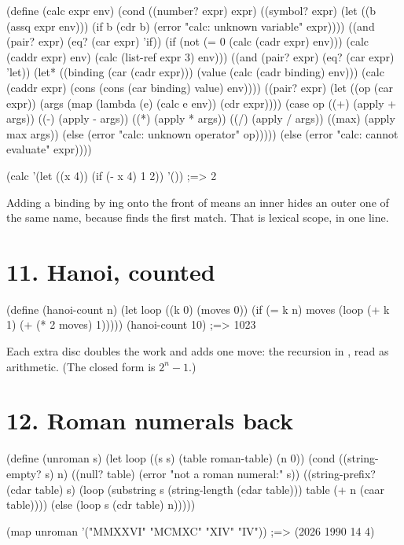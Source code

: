 \begin{scm}
(define (calc expr env)
  (cond ((number? expr) expr)
        ((symbol? expr)
         (let ((b (assq expr env)))
           (if b (cdr b) (error "calc: unknown variable" expr))))
        ((and (pair? expr) (eq? (car expr) 'if))
         (if (not (= 0 (calc (cadr expr) env)))
             (calc (caddr expr) env)
             (calc (list-ref expr 3) env)))
        ((and (pair? expr) (eq? (car expr) 'let))
         (let* ((binding (car (cadr expr)))
                (value (calc (cadr binding) env)))
           (calc (caddr expr) (cons (cons (car binding) value) env))))
        ((pair? expr)
         (let ((op (car expr))
               (args (map (lambda (e) (calc e env)) (cdr expr))))
           (case op
             ((+) (apply + args)) ((-) (apply - args))
             ((*) (apply * args)) ((/) (apply / args))
             ((max) (apply max args))
             (else (error "calc: unknown operator" op)))))
        (else (error "calc: cannot evaluate" expr))))

(calc '(let ((x 4)) (if (- x 4) 1 2)) '())   ;=> 2
\end{scm}

Adding a binding by ing onto the front of  means an
inner  hides an outer one of the same name, because 
finds the first match. That is lexical scope, in one line.

\section*{11. Hanoi, counted}

\begin{scm}
(define (hanoi-count n)
  (let loop ((k 0) (moves 0))
    (if (= k n) moves (loop (+ k 1) (+ (* 2 moves) 1)))))
(hanoi-count 10)   ;=> 1023
\end{scm}

Each extra disc doubles the work and adds one move: the recursion in
, read as arithmetic. (The closed form is $2^n - 1$.)

\section*{12. Roman numerals back}

\begin{scm}
(define (unroman s)
  (let loop ((s s) (table roman-table) (n 0))
    (cond ((string-empty? s) n)
          ((null? table) (error "not a roman numeral:" s))
          ((string-prefix? (cdar table) s)
           (loop (substring s (string-length (cdar table))) table
                 (+ n (caar table))))
          (else (loop s (cdr table) n)))))

(map unroman '("MMXXVI" "MCMXC" "XIV" "IV"))   ;=> (2026 1990 14 4)
\end{scm}

